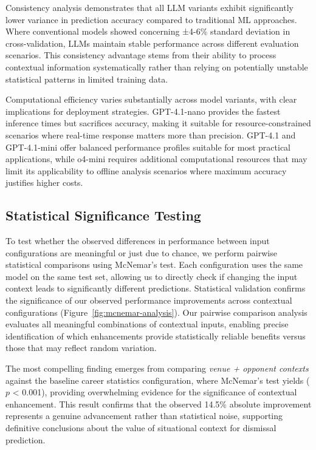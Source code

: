 \documentclass[sigconf,anonymous,review]{acmart}
\begin{document}
Consistency analysis demonstrates that all LLM variants exhibit significantly lower variance in prediction accuracy compared to traditional ML approaches. Where conventional models showed concerning ±4-6\% standard deviation in cross-validation, LLMs maintain stable performance across different evaluation scenarios. This consistency advantage stems from their ability to process contextual information systematically rather than relying on potentially unstable statistical patterns in limited training data.

Computational efficiency varies substantially across model variants, with clear implications for deployment strategies. GPT-4.1-nano provides the fastest inference times but sacrifices accuracy, making it suitable for resource-constrained scenarios where real-time response matters more than precision. GPT-4.1 and GPT-4.1-mini offer balanced performance profiles suitable for most practical applications, while o4-mini requires additional computational resources that may limit its applicability to offline analysis scenarios where maximum accuracy justifies higher costs.

\subsection{Statistical Significance Testing}
\label{sec:mcnemar-testing}

To test whether the observed differences in performance between input configurations are meaningful or just due to chance, we perform pairwise statistical comparisons using McNemar’s test. Each configuration uses the same model on the same test set, allowing us to directly check if changing the input context leads to significantly different predictions. Statistical validation confirms the significance of our observed performance improvements across contextual configurations (Figure~\ref{fig:mcnemar-analysis}). Our pairwise comparison analysis evaluates all meaningful combinations of contextual inputs, enabling precise identification of which enhancements provide statistically reliable benefits versus those that may reflect random variation.

The most compelling finding emerges from comparing \emph{venue + opponent contexts} against the baseline career statistics configuration, where McNemar's test yields ($p$ < 0.001), providing overwhelming evidence for the significance of contextual enhancement. This result confirms that the observed 14.5\% absolute improvement represents a genuine advancement rather than statistical noise, supporting definitive conclusions about the value of situational context for dismissal prediction.
\end{document}
